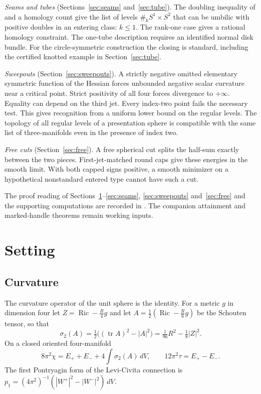 \documentclass[11pt,letterpaper]{article}
\numberwithin{equation}{section}
\theoremstyle{definition}
\DeclareMathOperator{\Ric}{Ric}
\DeclareMathOperator{\tr}{tr}
\begin{document}
\emph{Seams and tubes} (Sections~\ref{sec:seams} and~\ref{sec:tube}).
The doubling inequality of \cite{Baker2026ChiralMaster} and a homology
count give the list of levels \(\#_kS^1\times S^2\) that can be umbilic
with positive doubles in an entering class: \(k\le1\). The rank-one case gives a rational homology constraint.
The one-tube description requires an identified normal disk bundle.
For the circle-symmetric construction the closing is standard, including
the certified knotted example in Section~\ref{sec:tube}.

\emph{Sweepouts} (Section~\ref{sec:sweepouts}). A strictly negative
omitted elementary symmetric function of the Hessian forces unbounded
negative scalar curvature near a critical point. Strict positivity of
all four forces divergence to \(+\infty\). Equality can depend on the
third jet. Every index-two point fails the necessary test. This gives
recognition from a uniform lower bound on the regular levels. The
topology of all regular levels of a presentation sphere is compatible
with the same list of three-manifolds even in the presence of index two.

\emph{Free cuts} (Section~\ref{sec:free}). A free spherical cut splits
the half-sum exactly between the two pieces. First-jet-matched round caps
give these energies in the smooth limit. With both capped signs positive,
a smooth minimizer on a hypothetical nonstandard entered type cannot
have such a cut.

The proof reading of Sections~\ref{sec:setting}--\ref{sec:seams},
\ref{sec:sweepouts} and~\ref{sec:free} and the supporting computations
are recorded in \cite{Baker2026MarkedCutCalculations}.
The companion attainment and marked-handle theorems remain working inputs.

\section{Setting}\label{sec:setting}

\subsection{Curvature}
The curvature operator of the unit sphere is the identity. For a metric
\(g\) in dimension four let \(Z=\Ric-\tfrac R4g\) and let
\(A=\tfrac12(\Ric-\tfrac R6g)\) be the Schouten tensor, so that
\[
 \sigma_2(A)=\tfrac12\bigl((\tr A)^2-|A|^2\bigr)
 =\tfrac1{96}R^2-\tfrac18|Z|^2 .
\]
On a closed oriented four-manifold
\begin{equation}\label{eq:cgb}
 8\pi^2\chi=E_++E_-+4\int\sigma_2(A)\,dV,\qquad
 12\pi^2\tau=E_+-E_- .
\end{equation}
The first Pontryagin form of the Levi-Civita connection is
\(p_1=(4\pi^2)^{-1}(|W^+|^2-|W^-|^2)\,dV\).
\end{document}
